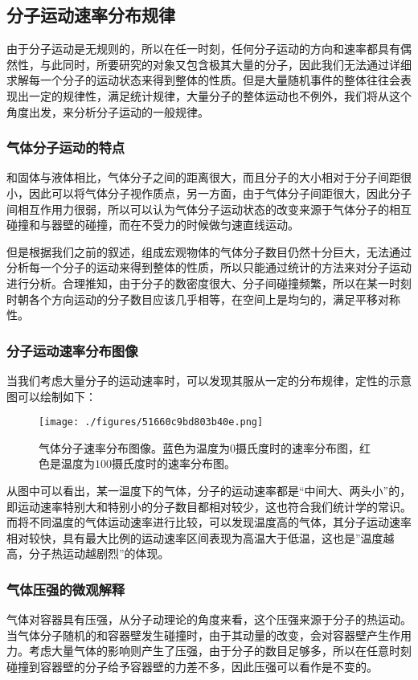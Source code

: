 \subsection{分子运动速率分布规律}
由于分子运动是无规则的，所以在任一时刻，任何分子运动的方向和速率都具有偶然性，与此同时，所要研究的对象又包含极其大量的分子，因此我们无法通过详细求解每一个分子的运动状态来得到整体的性质。但是大量随机事件的整体往往会表现出一定的规律性，满足统计规律，大量分子的整体运动也不例外，我们将从这个角度出发，来分析分子运动的一般规律。

\subsubsection{气体分子运动的特点}
和固体与液体相比，气体分子之间的距离很大，而且分子的大小相对于分子间距很小，因此可以将气体分子视作质点，另一方面，由于气体分子间距很大，因此分子间相互作用力很弱，所以可以认为气体分子运动状态的改变来源于气体分子的相互碰撞和与器壁的碰撞，而在不受力的时候做匀速直线运动。

但是根据我们之前的叙述，组成宏观物体的气体分子数目仍然十分巨大，无法通过分析每一个分子的运动来得到整体的性质，所以只能通过统计的方法来对分子运动进行分析。合理推知，由于分子的数密度很大、分子间碰撞频繁，所以在某一时刻时朝各个方向运动的分子数目应该几乎相等，在空间上是均匀的，满足平移对称性。

\subsubsection{分子运动速率分布图像}
当我们考虑大量分子的运动速率时，可以发现其服从一定的分布规律，定性的示意图可以绘制如下：
\begin{figure}[ht]
\centering
\texttt{[image: ./figures/51660c9bd803b40e.png]}
\caption{气体分子速率分布图像。蓝色为温度为$0$摄氏度时的速率分布图，红色是温度为$100$摄氏度时的速率分布图。} \label{fig_thermo_maxwell}
\end{figure}
从图中可以看出，某一温度下的气体，分子的运动速率都是“中间大、两头小”的，即运动速率特别大和特别小的分子数目都相对较少，这也符合我们统计学的常识。而将不同温度的气体运动速率进行比较，可以发现温度高的气体，其分子运动速率相对较快，具有最大比例的运动速率区间表现为高温大于低温，这也是”温度越高，分子热运动越剧烈”的体现。
\subsubsection{气体压强的微观解释}
气体对容器具有压强，从分子动理论的角度来看，这个压强来源于分子的热运动。当气体分子随机的和容器壁发生碰撞时，由于其动量的改变，会对容器壁产生作用力。考虑大量气体的影响则产生了压强，由于分子的数目足够多，所以在任意时刻碰撞到容器壁的分子给予容器壁的力差不多，因此压强可以看作是不变的。

